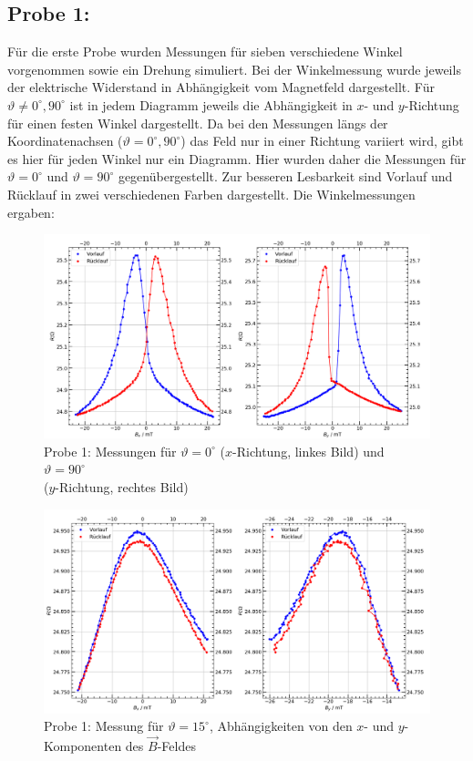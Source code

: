 \documentclass[german,  %
parskip=full,  %
]{scrartcl}
\begin{document}
\subsection{Probe 1:}
Für die erste Probe wurden Messungen für sieben verschiedene Winkel vorgenommen sowie ein Drehung simuliert. Bei der Winkelmessung wurde jeweils der elektrische Widerstand in Abhängigkeit vom Magnetfeld dargestellt. Für \(\vartheta\neq 0^{\circ},90^{\circ}\) ist in jedem Diagramm jeweils die Abhängigkeit in \(x\)- und \(y\)-Richtung für einen festen Winkel dargestellt. Da bei den Messungen längs der Koordinatenachsen (\(\vartheta = 0^{\circ},90^{\circ}\)) das Feld nur in einer Richtung variiert wird, gibt es hier für jeden Winkel nur ein Diagramm. Hier wurden daher die Messungen für  \(\vartheta = 0^{\circ}\) und \(\vartheta = 90^{\circ}\) gegenübergestellt. Zur besseren Lesbarkeit sind Vorlauf und Rücklauf in zwei verschiedenen Farben dargestellt. Die Winkelmessungen ergaben:
\newpage
\begin{figure}[h!]\centering
\includegraphics[width=\textwidth]{Probe1_0_und_90_Grad.png}
\caption{Probe 1: Messungen für \(\vartheta=0^{\circ}\) (\(x\)-Richtung, linkes Bild) und \(\vartheta=90^{\circ}\) \\ (\(y\)-Richtung, rechtes Bild)}
\end{figure} 
\begin{figure}[h!]\centering
\includegraphics[width=\textwidth]{Probe1_15_Grad.png}
\caption{Probe 1: Messung für \(\vartheta=15^{\circ}\), Abhängigkeiten von den \(x\)- und \(y\)-Komponenten des \(\vec{B}\)-Feldes}
\end{figure} 
\end{document}
